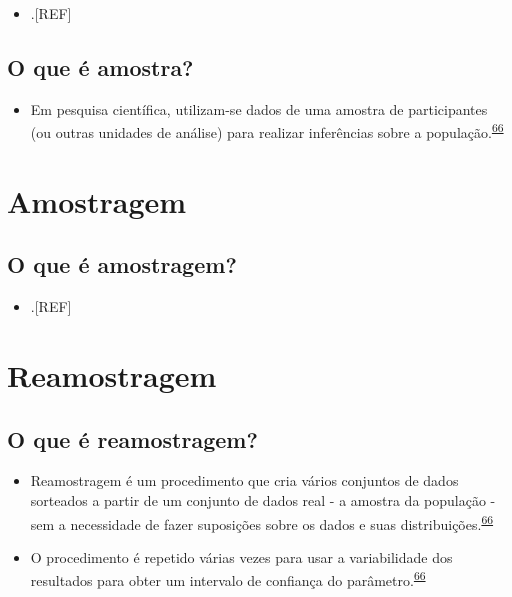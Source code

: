\documentclass[
]{book}
\providecommand{\tightlist}{%
  \setlength{\itemsep}{0pt}\setlength{\parskip}{0pt}}
\begin{document}
\begin{itemize}
\tightlist
\item
  .{[}REF{]}
\end{itemize}

\hypertarget{o-que-uxe9-amostra}{%
\subsection{O que é amostra?}\label{o-que-uxe9-amostra}}

\begin{itemize}
\tightlist
\item
  Em pesquisa científica, utilizam-se dados de uma amostra de participantes (ou outras unidades de análise) para realizar inferências sobre a população.\textsuperscript{\protect\hyperlink{ref-Bland2015}{66}}
\end{itemize}

\hypertarget{amostragem}{%
\section{Amostragem}\label{amostragem}}

\hypertarget{o-que-uxe9-amostragem}{%
\subsection{O que é amostragem?}\label{o-que-uxe9-amostragem}}

\begin{itemize}
\tightlist
\item
  .{[}REF{]}
\end{itemize}

\hypertarget{reamostragem}{%
\section{Reamostragem}\label{reamostragem}}

\hypertarget{o-que-uxe9-reamostragem}{%
\subsection{O que é reamostragem?}\label{o-que-uxe9-reamostragem}}

\begin{itemize}
\item
  Reamostragem é um procedimento que cria vários conjuntos de dados sorteados a partir de um conjunto de dados real - a amostra da população - sem a necessidade de fazer suposições sobre os dados e suas distribuições.\textsuperscript{\protect\hyperlink{ref-Bland2015}{66}}
\item
  O procedimento é repetido várias vezes para usar a variabilidade dos resultados para obter um intervalo de confiança do parâmetro.\textsuperscript{\protect\hyperlink{ref-Bland2015}{66}}
\end{itemize}
\end{document}
